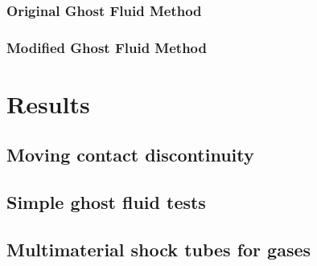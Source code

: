 \documentclass[final,3p,twocolumn,times]{elsarticle}
\begin{document}
\subsubsection{Original Ghost Fluid Method}
\label{subsubsec:ogfm}

\subsubsection{Modified Ghost Fluid Method}
\label{subsubsec:mgfm}

\section{Results}
\label{sec:results}

\subsection{Moving contact discontinuity}
\label{subsec:moving}

\subsection{Simple ghost fluid tests}
\label{subsec:toro}

\subsection{Multimaterial shock tubes for gases}
\label{subsec:shocktubes}

\end{document}

